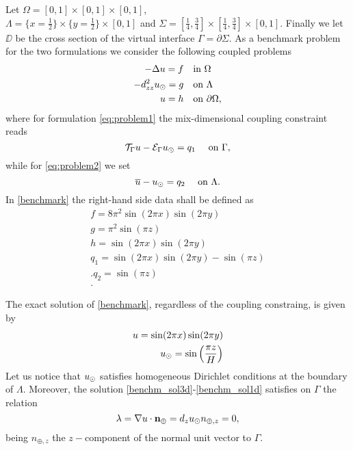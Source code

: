 \documentclass[r]{siamart171218}
\begin{document}
Let $\Omega=[0,1]\times [0,1]\times [0,1]$, \\$\Lambda=\{x=\tfrac{1}{2}\}\times \{y=\tfrac{1}{2}\} \times [0,1] $
and $\Sigma=[\tfrac{1}{4}, \tfrac{3}{4}]\times [\tfrac{1}{4}, \tfrac{3}{4}]\times [0, 1]$.
Finally we let $\DD$ be the cross section of the virtual interface $\Gamma=\partial \Sigma$.
As a benchmark problem for the two formulations we consider the following coupled problems
%
\begin{subequations}\label{benchmark}
\begin{align}
\label{benchm_3d}
-\Delta u=f \quad &\text{in $\Omega$}\\
\label{benchm_1d}
-d_{zz}^2 \ud =g \quad &\text{on $\Lambda$}\\
u=h \quad &\text{on $\partial \Omega$},
\end{align}
\end{subequations}
where for formulation \eqref{eq:problem1} the mix-dimensional coupling constraint reads
\begin{equation}
  \label{eq:couple_1}
\mathcal{T}_{\Gamma}u - \mathcal{E}_{\Gamma}\ud = q_1\quad\text{ on }\Gamma,
\end{equation}
while for \eqref{eq:problem2} we set
\begin{equation}
    \label{eq:couple_2}
\avrc{u} - \ud = q_2\quad\text{ on }\Lambda.
\end{equation}
%
In \eqref{benchmark} the right-hand side data shall be defined as 
\begin{eqnarray*}
f=8\pi ^2 \sin (2\pi x) \sin (2\pi y)\\
g={\pi ^2}\sin \left({\pi z}\right)\\
h=\sin (2\pi x) \sin (2\pi y)\\
q_1=\sin (2\pi x) \sin (2\pi y) - \sin \left({\pi z}\right)\\.
q_2=\sin \left({\pi z}\right)\\.
\end{eqnarray*}

The exact solution of \eqref{benchmark}, regardless of the coupling constraing,
is given by
%
\begin{eqnarray}
\label{benchm_sol3d}
u=\sin (2\pi x) \sin (2\pi y)\\
\label{benchm_sol1d}
\ud=\sin \left(\frac{\pi z}{H}\right) 
\end{eqnarray}
%
Let us notice that $u_{\odot}$ satisfies homogeneous Dirichlet conditions at the boundary of $\Lambda$.
Moreover, the solution \eqref{benchm_sol3d}-\eqref{benchm_sol1d} satisfies on $\Gamma$ the relation
\begin{equation}\label{benchm_flux}
\lambda=\nabla u \cdot \textbf{n}_{\oplus}=d_z \ud n_{\oplus,z}=0,
\end{equation}
being $n_{\oplus,z}$ the $z-$component of the normal unit vector to $\Gamma$.
\end{document}

